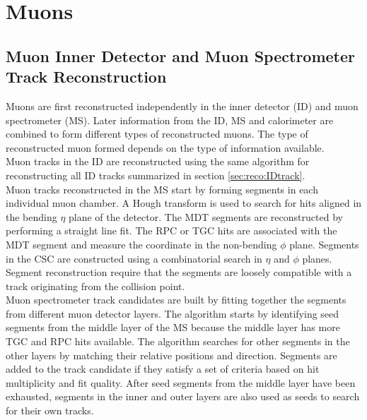 \section{Muons}
\label{sec:reco:muon}

\subsection{Muon Inner Detector and Muon Spectrometer Track Reconstruction}
\label{sec:reco:IDMStrk}

\indent Muons are first reconstructed independently in the inner detector (ID) and muon spectrometer (MS). Later information from the ID, MS and calorimeter are combined to form different types of reconstructed muons.  The type of reconstructed muon formed depends on the type of information available.\cite{MuonReco} \\

\indent Muon tracks in the ID are reconstructed using the same algorithm for reconstructing all ID tracks summarized in section \ref{sec:reco:IDtrack}. \\

\indent Muon tracks reconstructed in the MS start by forming segments in each individual muon chamber.  A Hough transform is used to search for hits aligned in the bending $\eta$ plane of the detector.\cite{HoughTrans}  The MDT segments are reconstructed by performing a straight line fit.  The RPC or TGC hits are associated with the MDT segment and measure the coordinate in the non-bending $\phi$ plane.  Segments in the CSC are constructed using a combinatorial search in $\eta$ and $\phi$ planes.  Segment reconstruction require that the segments are loosely compatible with a track originating from the collision point.  \\

\indent Muon spectrometer track candidates are built by fitting together the segments from different muon detector layers.  The algorithm starts by identifying seed segments from the middle layer of the MS because the middle layer has more TGC and RPC hits available.  The algorithm searches for other segments in the other layers by matching their relative positions and direction.  Segments are added to the track candidate if they satisfy a set of criteria based on hit multiplicity and fit quality.   After seed segments from the middle layer have been exhausted, segments in the inner and outer layers are also used as seeds to search for their own tracks.  \\

